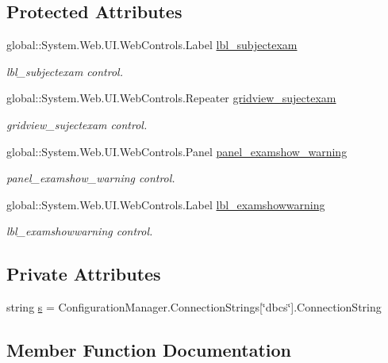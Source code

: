\subsection*{Protected Attributes}
\begin{DoxyCompactItemize}
\item 
global\+::\+System.\+Web.\+U\+I.\+Web\+Controls.\+Label \mbox{\hyperlink{classsubjectexam_a54e8c808d5166ccec18cdb8a1c9d5570}{lbl\+\_\+subjectexam}}
\begin{DoxyCompactList}\small\item\em lbl\+\_\+subjectexam control. \end{DoxyCompactList}\item 
global\+::\+System.\+Web.\+U\+I.\+Web\+Controls.\+Repeater \mbox{\hyperlink{classsubjectexam_a8387fc4c835e97171deccb08e1404887}{gridview\+\_\+sujectexam}}
\begin{DoxyCompactList}\small\item\em gridview\+\_\+sujectexam control. \end{DoxyCompactList}\item 
global\+::\+System.\+Web.\+U\+I.\+Web\+Controls.\+Panel \mbox{\hyperlink{classsubjectexam_ad907d6750b00077c57e06fd4a3b97d33}{panel\+\_\+examshow\+\_\+warning}}
\begin{DoxyCompactList}\small\item\em panel\+\_\+examshow\+\_\+warning control. \end{DoxyCompactList}\item 
global\+::\+System.\+Web.\+U\+I.\+Web\+Controls.\+Label \mbox{\hyperlink{classsubjectexam_a76a36d2d5027fa34bc200369ecd6b774}{lbl\+\_\+examshowwarning}}
\begin{DoxyCompactList}\small\item\em lbl\+\_\+examshowwarning control. \end{DoxyCompactList}\end{DoxyCompactItemize}
\subsection*{Private Attributes}
\begin{DoxyCompactItemize}
\item 
string \mbox{\hyperlink{classsubjectexam_a24af485f0cbcbe2fdbf178cb10433dc6}{s}} = Configuration\+Manager.\+Connection\+Strings\mbox{[}\char`\"{}dbcs\char`\"{}\mbox{]}.Connection\+String
\end{DoxyCompactItemize}


\subsection{Member Function Documentation}
\mbox{\label{classsubjectexam_ac0fe9d455ce59cdeeacdf71544f1786f}} 
